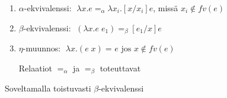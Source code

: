 \begin{maar}

\begin{enumerate}
	\item $\alpha$-ekvivalenssi: $\; \lambda x.e =_{\alpha} \lambda x_{i}.[x/x_{i}]e$, missä $x_{i} \notin fv(e)$
	\item $\beta$-ekvivalenssi: $\; (\lambda x.e \; e_{1}) =_{\beta} [e_{1} / x]e$
	\item $\eta$-muunnos: $\; \lambda x.(e \; x) =_{} e \text{ jos } x \notin fv(e)$
	
	Relaatiot $=_{\alpha}$ ja $=_{\beta}$ toteuttavat 
		
\end{enumerate}
\end{maar}

\par

Soveltamalla toistuvasti $\beta$-ekvivalenssi  
 
\par

